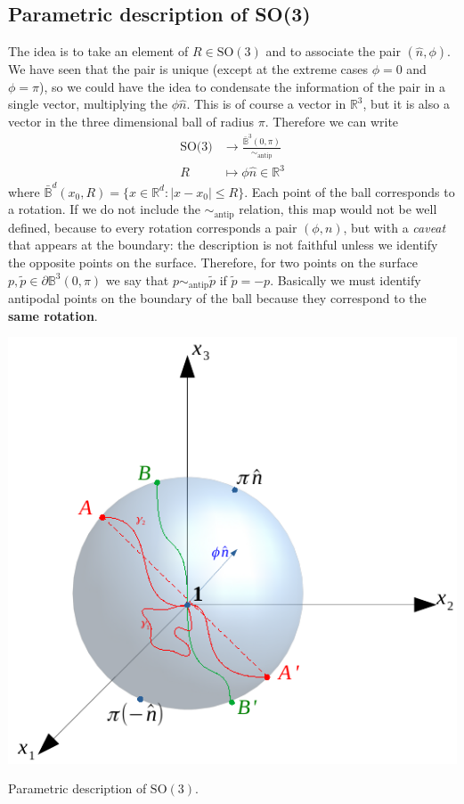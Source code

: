 \documentclass[../main.tex]{subfiles}
\begin{document}
\subsection{Parametric description of SO(3)}
The idea is to take an element of $R\in\textrm{SO}(3)$ and to associate the pair $(\hat{n},\phi)$. We have seen that the pair is unique (except at the extreme cases $\phi=0$ and $\phi=\pi$), so we could have the idea to condensate the information of the pair in a single vector, multiplying the $\phi\hat{n}$. This is of course a vector in $\mathbb{R}^3$, but it is also a vector in the three dimensional ball of radius $\pi$. Therefore we can write
\begin{align*}
\text{SO(3)}&\xrightarrow[]{}\frac{\bar{\mathbb{B}}^3(0,\pi)}{\sim_{\text{antip}}}\\
R&\mapsto\phi\hat{n}\in\mathbb{R}^3
\end{align*}
where $\bar{\mathbb{B}}^d(x_0,R)=\{x\in\mathbb{R}^d:|x-x_0|\le R\}$. Each point of the ball corresponds to a rotation. If we do not include the $\sim_{\text{antip}}$ relation, this map would not be well defined, because to every rotation corresponds a pair $(\phi, n)$, but with a \textit{caveat} that appears at the boundary: the description is not faithful unless we identify the opposite points on the surface. Therefore, for two points on the surface $p,\tilde{p}\in\partial\mathbb{B}^3(0,\pi)$ we say that {\color{red}$p\sim_{\text{antip}}\tilde{p}$} if $\tilde{p}=-p$. Basically we must identify antipodal points on the boundary of the ball because they correspond to the \textbf{same rotation}.
\begin{marginfigure}[-40mm]
    \includegraphics[width=1\linewidth]{images/equivalence.pdf}
	\caption[Parametric description of $\textrm{SO}(3)$]{Parametric description of $\textrm{SO}(3)$.} %
\end{marginfigure} %
\end{document}
